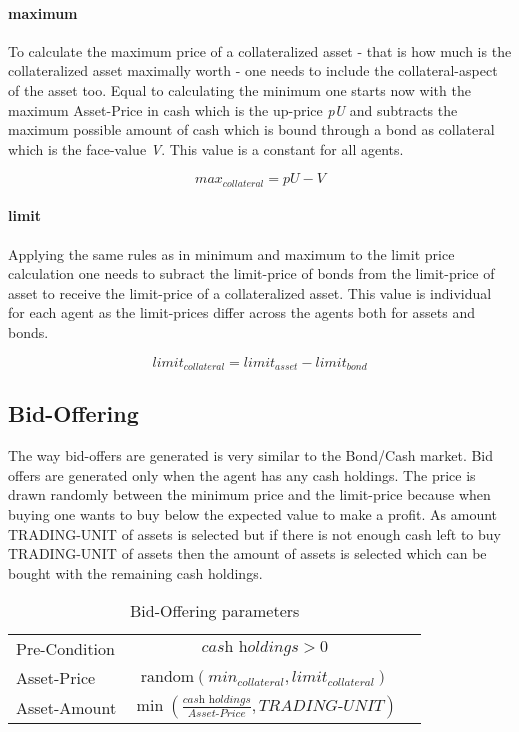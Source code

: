 \documentclass[Bachelorarbeit.tex]{subfiles}
\begin{document}
\paragraph{maximum}
To calculate the maximum price of a collateralized asset - that is how much is the collateralized asset maximally worth - one needs to include the collateral-aspect of the asset too. Equal to calculating the minimum one starts now with the maximum Asset-Price in cash which is the up-price \textit{pU} and subtracts the maximum possible amount of cash which is bound through a bond as collateral which is the face-value \textit{V}. This value is a constant for all agents.

\begin{equation}
max_{collateral} = \textit{pU} - \textit{V}
\end{equation}

\paragraph{limit}
Applying the same rules as in minimum and maximum to the limit price calculation one needs to subract the limit-price of bonds from the limit-price of asset to receive the limit-price of a collateralized asset. This value is individual for each agent as the limit-prices differ across the agents both for assets and bonds.

\begin{equation}
limit_{collateral} = limit_{asset} - limit_{bond}
\end{equation}

\subsection{Bid-Offering}
The way bid-offers are generated is very similar to the Bond/Cash market. Bid offers are generated only when the agent has any cash holdings. The price is drawn randomly between the minimum price and the limit-price because when buying one wants to buy below the expected value to make a profit. As amount TRADING-UNIT of assets is selected but if there is not enough cash left to buy TRADING-UNIT of assets then the amount of assets is selected which can be bought with the remaining cash holdings.

\begin{table}[H]
	\centering
	\caption{Bid-Offering parameters}
	\begin{tabular} { l c r }
		\hline
		Pre-Condition & $\textit{cash holdings} > 0$  \\
		Asset-Price & $\mathrm{random}(min_{collateral}, limit_{collateral})$ \\
		Asset-Amount & $\min ( \frac{ \textit{cash holdings} }{ \textit{Asset-Price} }, \textit{TRADING-UNIT} )$ \\
		\hline
	\end{tabular}
\end{table}
\end{document}
